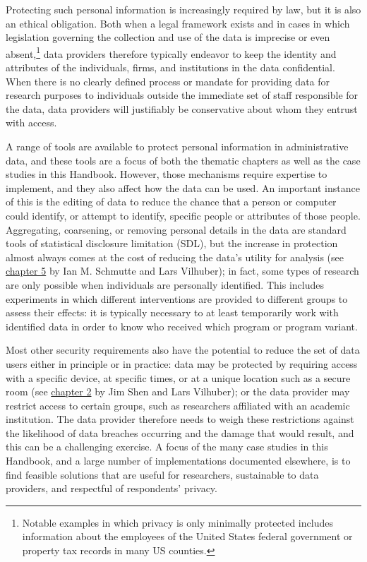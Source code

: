 Protecting such personal information is increasingly required by law, but it is also an ethical obligation. Both when a legal framework exists and in cases in which legislation governing the collection and use of the data is imprecise or even absent,\footnote{Notable examples in which privacy is only minimally protected includes information about the employees of the United States federal government or property tax records in many US counties.} data providers therefore typically endeavor to keep the identity and attributes of the individuals, firms, and institutions in the data confidential. When there is no clearly defined process or mandate for providing data for research purposes to individuals outside the immediate set of staff responsible for the data, data providers will justifiably be conservative about whom they entrust with access.

A range of tools are available to protect personal information in administrative data, and these tools are a focus of both the thematic chapters as well as the case studies in this Handbook. However, those mechanisms require expertise to implement, and they also affect how the data can be used. An important instance of this is the editing of data to reduce the chance that a person or computer could identify, or attempt to identify, specific people or attributes of those people. Aggregating, coarsening, or removing personal details in the data are standard tools of statistical disclosure limitation (SDL), but the increase in protection almost always comes at the cost of reducing the data's utility for analysis (see \protect\hyperlink{discavoid}{chapter 5} by Ian M. Schmutte and Lars Vilhuber); in fact, some types of research are only possible when individuals are personally identified. This includes experiments in which different interventions are provided to different groups to assess their effects: it is typically necessary to at least temporarily work with identified data in order to know who received which program or program variant.

Most other security requirements also have the potential to reduce the set of data users either in principle or in practice: data may be protected by requiring access with a specific device, at specific times, or at a unique location such as a secure room (see \protect\hyperlink{security}{chapter 2} by Jim Shen and Lars Vilhuber); or the data provider may restrict access to certain groups, such as researchers affiliated with an academic institution. The data provider therefore needs to weigh these restrictions against the likelihood of data breaches occurring and the damage that would result, and this can be a challenging exercise. A focus of the many case studies in this Handbook, and a large number of implementations documented elsewhere, is to find feasible solutions that are useful for researchers, sustainable to data providers, and respectful of respondents' privacy.

